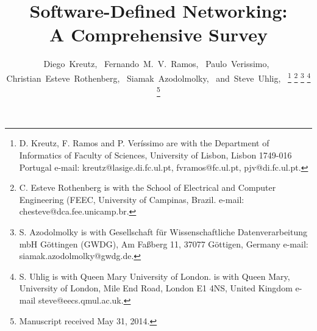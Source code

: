 \documentclass[journal]{IEEEtran}
\begin{document}
%

%
\title{Software-Defined Networking: \\A Comprehensive Survey}


%
%
%

\author{Diego~Kreutz,~
        Fernando~M.~V.~Ramos,~
        Paulo~Verissimo,~
        Christian~Esteve~Rothenberg,~        
        Siamak~Azodolmolky,~        
        and~Steve~Uhlig,~%
\thanks{D. Kreutz, F. Ramos and P. Ver\'{i}ssimo are with the Department of Informatics of Faculty of Sciences, University of Lisbon, Lisbon
    1749-016 Portugal e-mail: kreutz@lasige.di.fc.ul.pt, fvramos@fc.ul.pt, pjv@di.fc.ul.pt.}
\thanks{C. Esteve Rothenberg is with the School of Electrical and Computer Engineering (FEEC, University of Campinas, Brazil. e-mail: chesteve@dca.fee.unicamp.br.}
\thanks{S. Azodolmolky is with Gesellschaft f\"{u}r Wissenschaftliche Datenverarbeitung mbH G\"{o}ttingen (GWDG), Am Fa{\ss}berg 11, 37077 G\"{o}ttigen, Germany e-mail: siamak.azodolmolky@gwdg.de.}
\thanks{S. Uhlig is with Queen Mary University of London. is with Queen Mary, University of London, Mile End Road, London E1 4NS, United Kingdom e-mail steve@eecs.qmul.ac.uk.}%
\thanks{Manuscript received May 31, 2014.}}
\end{document}
